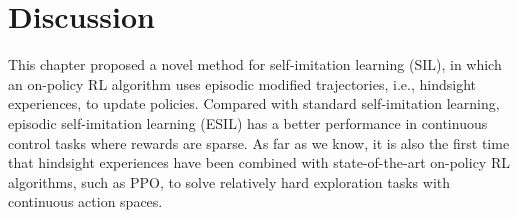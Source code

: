\begin{table}[h]
  \centering
   \caption[Average success rate of ESIL and other baselines in the last 10 epochs during training.]{Average success rate $\pm$ standard error in the last 10 epochs over five random seeds in all~environments {(\textbf{bold} indicates the best result among all methods).}}
  \label{tb:ch3_last}
\end{table}

\section{Discussion}
\label{sec:conclusion}
This chapter proposed a novel method for self-imitation learning (SIL), in which an on-policy RL algorithm uses episodic modified trajectories, i.e., hindsight experiences, to update policies. Compared with standard self-imitation learning, episodic self-imitation learning (ESIL) has a better performance in continuous control tasks where rewards are sparse. As far as we know, it is also the first time that hindsight experiences have been combined with state-of-the-art on-policy RL algorithms, such as PPO, to solve relatively hard exploration tasks with continuous action spaces.

